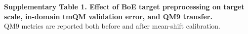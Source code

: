 \documentclass[border=8pt,varwidth]{standalone}
\begin{document}
\small
\textbf{Supplementary Table 1. Effect of BoE target preprocessing on target scale, in-domain tmQM validation error, and QM9 transfer.}\\[0.5em]
QM9 metrics are reported both before and after mean-shift calibration.\\[0.8em]

\end{document}
